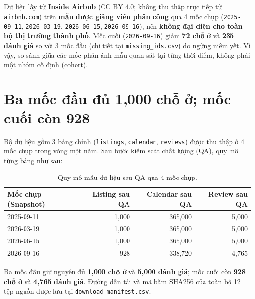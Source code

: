 \documentclass[11pt,a4paper]{article}
\begin{document}
\begin{caveatbox}
Dữ liệu lấy từ \textbf{Inside Airbnb} (CC BY 4.0; không thu thập trực tiếp từ \texttt{airbnb.com}) trên \textbf{mẫu được giảng viên phân công} qua 4 mốc chụp (\texttt{2025-09-11}, \texttt{2026-03-19}, \texttt{2026-06-15}, \texttt{2026-09-16}), nên \textbf{không đại diện cho toàn bộ thị trường thành phố}. Mốc cuối (\texttt{2026-09-16}) giảm \textbf{72 chỗ ở} và \textbf{235 đánh giá} so với 3 mốc đầu (chi tiết tại \texttt{missing\_ids.csv}) do ngừng niêm yết. Vì vậy, so sánh giữa các mốc phản ánh mẫu quan sát tại từng thời điểm, không phải một nhóm cố định (cohort).
\end{caveatbox}

\section{Ba mốc đầu đủ 1,000 chỗ ở; mốc cuối còn 928}

Bộ dữ liệu gồm 3 bảng chính (\texttt{listings}, \texttt{calendar}, \texttt{reviews}) được thu thập ở 4 mốc chụp trong vòng một năm. Sau bước kiểm soát chất lượng (QA), quy mô từng bảng như sau:

\begin{table}[H]
  \centering
  \small
  \renewcommand{\arraystretch}{1.25}
  \begin{tabularx}{0.92\textwidth}{Xrrr}
    \toprule
    \rowcolor{NavyDark}
    \color{white}\textbf{Mốc chụp (Snapshot)} &
    \color{white}\textbf{Listing sau QA} &
    \color{white}\textbf{Calendar sau QA} &
    \color{white}\textbf{Review sau QA} \\
    \midrule
    2025-09-11 & 1,000 & 365,000 & 5,000 \\
    \rowcolor{LightBg}
    2026-03-19 & 1,000 & 365,000 & 5,000 \\
    2026-06-15 & 1,000 & 365,000 & 5,000 \\
    \rowcolor{LightBg}
    2026-09-16 & 928 & 338,720 & 4,765 \\
    \bottomrule
  \end{tabularx}
  \caption{\small Quy mô mẫu dữ liệu sau QA qua 4 mốc chụp.}
\end{table}

Ba mốc đầu giữ nguyên đủ \textbf{1,000 chỗ ở} và \textbf{5,000 đánh giá}; mốc cuối còn \textbf{928 chỗ ở} và \textbf{4,765 đánh giá}. Đường dẫn tải và mã băm SHA256 của toàn bộ 12 tệp nguồn được lưu tại \texttt{download\_manifest.csv}.
\end{document}
